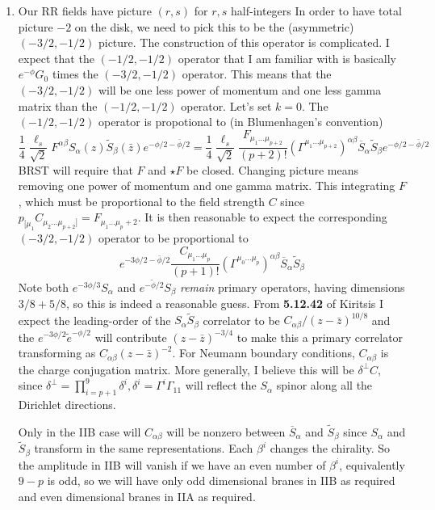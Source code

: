 \documentclass[11pt, class=article, crop=false]{standalone}
\begin{document}
\begin{enumerate}
	\item Our RR fields have picture $(r, s)$ for $r,s$ half-integers In order to have total picture $-2$ on the disk, we need to pick this to be the (asymmetric) $(-3/2, -1/2)$ picture. The construction of this operator is complicated. I expect that the $(-1/2,-1/2)$ operator that I am familiar with is basically $e^{- \phi} G_0$ times the $(-3/2,-1/2)$ operator. This means that the $(-3/2, -1/2)$ will be one less power of momentum and one less gamma matrix than the $(-1/2, -1/2)$ operator. Let's set $k = 0$. The $(-1/2, -1/2)$ operator is propotional to (in Blumenhagen's convention)
	\[
		\frac14 \frac{\ell_s}{\sqrt 2} F^{\alpha \beta}  S_{\alpha}(z) \tilde S_\beta(\bar z) e^{-\phi/2 - \bar \phi/2} = \frac14 \frac{\ell_s}{\sqrt 2}
		\frac{F_{\mu_1 \dots \mu_{p+2}}}{(p+2)!} (\Gamma^{\mu_1 \dots \mu_{p+2}})^{\alpha \beta} \overline{S}_{\alpha} \tilde S_{\beta} e^{-\phi/2 - \bar \phi/2}
	\]
	BRST will require that $F$ and $\star F$ be closed. 
	Changing picture means removing one power of momentum and one gamma matrix. This integrating $F$, which must be proportional to the field strength $C$ since $p_{[\mu_1} C_{\mu_2 \dots \mu_{p+2}]} = F_{\mu_1 \dots \mu_p+2}$. It is then reasonable to expect the corresponding $(-3/2, -1/2)$ operator to be proportional to
	\[
		 e^{-3\phi/2 - \bar \phi/2} \frac{C_{\mu_1 \dots \mu_{p}}}{(p+1)!} (\Gamma^{\mu_0 \dots \mu_{p}})^{\alpha \beta} \overline{S}_\alpha \tilde S_\beta
	\]
	Note both $e^{-3\phi/3} S_{\alpha}$ and $e^{-\tilde \phi/2} S_{\beta}$ \emph{remain} primary operators, having dimensions $3/8 + 5/8$, so this is indeed a reasonable guess. From \textbf{5.12.42} of Kiritsis  I expect the leading-order of the $S_\alpha \tilde S_\beta$ correlator to be $C_{\alpha \beta}/(z - \bar z)^{10/8}$ and the $e^{-3\phi/2} \tilde e^{-\phi/2}$ will contribute $(z-\bar z)^{-3/4}$ to make this a primary correlator transforming as $C_{\alpha \beta} (z - \bar z)^{-2}$. For Neumann boundary conditions, $C_{\alpha \beta}$ is the charge conjugation matrix. More generally, I believe this will be $\delta^\perp C$, since $\delta^\perp = \prod_{i=p+1}^9 \delta^i, \delta^i = \Gamma^i \Gamma_{11}$ will reflect the $S_\alpha$ spinor along all the Dirichlet directions. 
	
	Only in the IIB case will $C_{\alpha \beta}$ will be nonzero between $\overline{S}_\alpha$ and $\tilde S_\beta$ since $S_\alpha$ and $\tilde S_\beta$ transform in the same representations. Each $\beta^i$ changes the chirality. So the amplitude in IIB will vanish if we have an even number of $\beta^i$, equivalently $9-p$ is odd, so we will have only odd dimensional branes in IIB as required and even dimensional branes in IIA as required. 
	

\end{enumerate}
\end{document}
